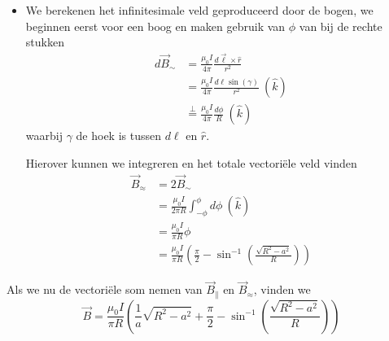 \begin{description}[labelwidth=1.5cm, leftmargin=!]
\begin{itemize}
        \newpage
        
        \item 
            We berekenen het infinitesimale veld geproduceerd door de bogen, we beginnen eerst voor een boog en maken gebruik van $\phi$ van bij de rechte stukken
            \begin{align*}
                d\Vec{B}_{\sim}
                &= \frac{\mu_0I}{4\pi}\frac{d\Vec{\ell}\times\hat{r}}{r^2} \\
                &=  \frac{\mu_0I}{4\pi}\frac{d\ell\sin(\gamma)}{r^2} \ (\hat{k})  \\
                &\overset{\perp}{=} \frac{\mu_0I}{4\pi}\frac{d\phi}{R} \ (\hat{k}) 
            \end{align*}
            waarbij $\gamma$ de hoek is tussen $d\ell$ en $\hat{r}$. 

            Hierover kunnen we integreren en het totale vectoriële veld vinden
            \begin{align*}
                \Vec{B}_{\approx}
                &= 2\Vec{B}_{\sim} \\
                &= \frac{\mu_0I}{2\pi R}\int_{-\phi}^{\phi} d\phi \ (\hat{k}) \\
                &= \frac{\mu_0I}{\pi R}\phi \\
                &= \frac{\mu_0I}{\pi R}\left(\frac{\pi}{2}-\sin^{-1}\left(\frac{\sqrt{R^2-a^2}}{R}\right)\right)
            \end{align*}
    \end{itemize}
    Als we nu de vectoriële som nemen van $\Vec{B}_{\parallel}$ en $\Vec{B}_{\approx}$, vinden we
    \begin{equation*}
        \Vec{B} = \frac{\mu_0I}{\pi R}\left(\frac{1}{a}\sqrt{R^2-a^2} + \frac{\pi}{2} -\sin^{-1}\left(\frac{\sqrt{R^2-a^2}}{R}\right) \right)
    \end{equation*}
    
\end{description}

\vspace{1cm}